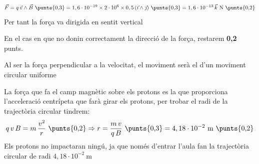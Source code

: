 \begin{solapartat}
\[ \vec{F} = q\,\vec{v}\wedge\vec{B} \ \text{\punts{0,3}} = 1,6\cdot 10^{-19}\times 2\cdot 10^{6}\times 0,5\,(\vec{\imath}\wedge\vec{\jmath}) \ \text{\punts{0,3}} = 1,6\cdot 10^{-13}\,\vec{k}\ \mathrm{N} \ \text{\punts{0,2}} \]
Per tant la força va dirigida en sentit vertical 

En el cas en que no donin correctament la direcció de la força, restarem \textbf{0,2} punts.
\end{solapartat}

\begin{solapartat}
Al ser la força perpendicular a la velocitat, el moviment serà el d'un moviment circular uniforme 

La força que fa el camp magnètic sobre els protons es la que proporciona l'acceleració centrípeta que farà girar els protons, per trobar el radi de la trajectòria circular tindrem:
\[ q\,v\,B = m\,\frac{v^2}{r} \ \text{\punts{0,2}} \Rightarrow r = \frac{m\,v}{q\,B} \ \text{\punts{0,3}} = 4,18\cdot 10^{-2}\ \mathrm{m} \ \text{\punts{0,2}} \]
Els protons no impactaran ningú, ja que només d'entrar l'aula fan la trajectòria circular de radi $4,18\cdot 10^{-2}\ \mathrm{m}$ 
\end{solapartat}
